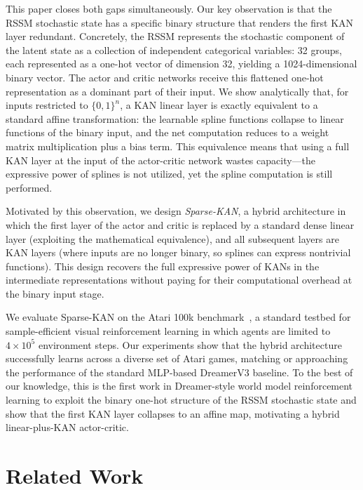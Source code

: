 \documentclass[11pt, a4paper]{article}
\begin{document}
This paper closes both gaps simultaneously. Our key observation is that the
RSSM stochastic state has a specific binary structure that renders the first KAN
layer redundant. Concretely, the RSSM represents the stochastic
component of the latent state as a collection of independent categorical
variables: 32 groups, each represented as a one-hot vector of dimension 32,
yielding a 1024-dimensional binary vector. The actor and critic networks
receive this flattened one-hot representation as a dominant part of their
input. We show analytically that, for inputs restricted to $\{0, 1\}^n$, a
KAN linear layer is exactly equivalent to a standard affine transformation: the
learnable spline functions collapse to linear functions of the binary input, and
the net computation reduces to a weight matrix multiplication plus a bias term.
This equivalence means that using a full KAN layer at the input of the
actor-critic network wastes capacity---the expressive power of splines is not
utilized, yet the spline computation is still performed.

Motivated by this observation, we design \emph{Sparse-KAN}, a hybrid
architecture in which the first layer of the actor and critic is replaced by a
standard dense linear layer (exploiting the mathematical equivalence), and all
subsequent layers are KAN layers (where inputs are no longer binary, so splines
can express nontrivial functions). This design recovers the full expressive
power of KANs in the intermediate representations without paying for their
computational overhead at the binary input stage.

We evaluate Sparse-KAN on the Atari 100k benchmark~\cite{kaiser2020atari100k},
a standard testbed for sample-efficient visual reinforcement learning in which
agents are limited to $4 \times 10^5$ environment steps. Our experiments show
that the hybrid architecture successfully learns across a diverse set of Atari
games, matching or approaching the performance of the standard MLP-based
DreamerV3 baseline. To the best of our knowledge, this is the first work in Dreamer-style
world model reinforcement learning to exploit the binary one-hot structure of
the RSSM stochastic state and show that the first KAN layer collapses to an
affine map, motivating a hybrid linear-plus-KAN actor-critic.


\section{Related Work}
\end{document}
